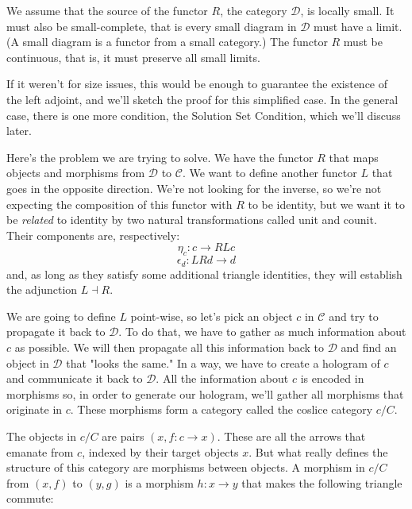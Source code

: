 \documentclass[11pt]{amsart}
\newcommand{\cat}[1]{\mathcal{#1}}
\begin{document}
We assume that the source of the functor $R$, the category $\cat D$, is locally small. It must also be small-complete, that is every small diagram in $\cat D$ must have a limit. (A small diagram is a functor from a small category.) The functor $R$ must be continuous, that is, it must preserve all small limits. 

If it weren't for size issues, this would be enough to guarantee the existence of the left adjoint, and we'll sketch the proof for this simplified case. In the general case, there is one more condition, the Solution Set Condition, which we'll discuss later.

Here's the problem we are trying to solve. We have the functor $R$ that maps objects and morphisms from $\cat D$ to $\cat C$. We want to define another functor $L$ that goes in the opposite direction. We're not looking for the inverse, so we're not expecting the composition of this functor with $R$ to be identity, but we want it to be \emph{related} to identity by two natural transformations called unit and counit. Their components are, respectively:
\[ \eta_c : c \to R L c\]
\[\epsilon_d : L R d \to d \]
and, as long as they satisfy some additional triangle identities, they will establish the adjunction $L \dashv R$.

We are going to define $L$ point-wise, so let's pick an object $c$ in $\cat C$ and try to propagate it back to $\cat D$. To do that, we have to gather as much information about $c$ as possible. We will then propagate all this information back to $\cat D$ and find an object in $\cat D$ that "looks the same." In a way, we have to create a hologram of $c$ and communicate it back to $\cat D$. All the information about $c$ is encoded in morphisms so, in order to generate our hologram, we'll gather all morphisms that originate in $c$. These morphisms form a category called the coslice category $c/C$. 

The objects in $c/C$ are pairs $(x, f \colon c \to x)$. These are all the arrows that emanate from $c$, indexed by their target objects $x$. But what really defines the structure of this category are morphisms between objects. A morphism in $c/C$ from $(x, f)$ to $(y, g)$ is a morphism $h \colon x \to y$ that makes the following triangle commute:

\begin{figure}[H]
\centering
\end{figure}
\end{document}
